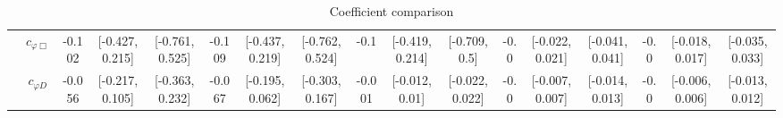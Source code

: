 \documentclass{article}
\begin{document}
\begin{table}[H]
\begin{tabular}{|c|c|c|c|c|c|c|c|c|c|c|c|c|c|c|c|c|}
 & $c_{\varphi \Box}$ & -0.102                             & [-0.427,0.215]                                 & [-0.761,0.525] & -0.109                             & [-0.437,0.219]                                 & [-0.762,0.524] & -0.1                             & [-0.419,0.214]                                 & [-0.709,0.5] & -0.0                             & [-0.022,0.021]                                 & [-0.041,0.041] & -0.0                             & [-0.018,0.017]                                 & [-0.035,0.033] \\ \cline{2-17}
 & $c_{\varphi D}$ & -0.056                             & [-0.217,0.105]                                 & [-0.363,0.232] & -0.067                             & [-0.195,0.062]                                 & [-0.303,0.167] & -0.001                             & [-0.012,0.01]                                 & [-0.022,0.022] & -0.0                             & [-0.007,0.007]                                 & [-0.014,0.013] & -0.0                             & [-0.006,0.006]                                 & [-0.013,0.012] \\ \cline{2-17}
\hline
\end{tabular}
\caption{Coefficient comparison}
\end{table}
\end{document}
